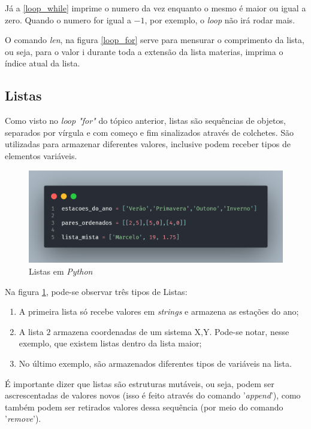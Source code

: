 \documentclass[a4paper, 12pt]{article} %
\begin{document}
Já a \ref{loop_while} imprime o numero da vez enquanto o mesmo é maior ou igual a zero. Quando o numero for igual a $-1$, por exemplo, o \textit{loop} não irá rodar mais.

O comando \textit{len}, na figura \ref{loop_for} serve para mensurar o comprimento da lista, ou seja, para o valor i durante toda a extensão da lista materias, imprima o índice atual da lista.

\subsection{Listas}
\label{Listas}
Como visto no \textit{loop "for"} do tópico anterior, listas são sequências de objetos, separados por vírgula e com começo e fim sinalizados através de colchetes. São utilizadas para armazenar diferentes valores, inclusive podem receber tipos de elementos variáveis.

\begin{figure}[ht]
    \centering
    \includegraphics[width = 12cm]{imagens/listas.png}
    \caption{Listas em \textit{Python}}
    \label{listas}
\end{figure}

Na figura \ref{listas}, pode-se observar três tipos de Listas:
\begin{enumerate}
    \item A primeira lista só recebe valores em \textit{strings} e armazena as estações do ano;
    \item A lista $2$ armazena coordenadas de um sistema X,Y. Pode-se notar, nesse exemplo, que existem listas dentro da lista maior;
    \item No último exemplo, são armazenados diferentes tipos de variáveis na lista.
\end{enumerate}

É importante dizer que listas são estruturas mutáveis, ou seja, podem ser ascrescentadas de valores novos (isso é feito através do comando '\textit{append}'), como também podem ser retirados valores dessa sequência (por meio do comando '\textit{remove}').
\end{document}
